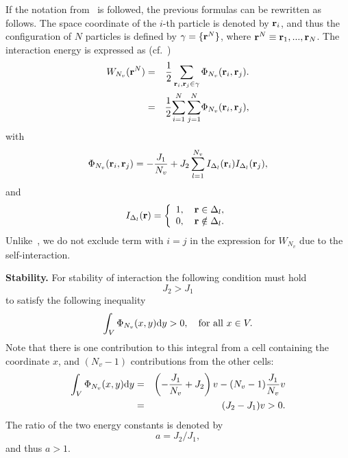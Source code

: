 \documentclass[12pt]{article}
\numberwithin{equation}{section}
\begin{document}
	\begin{mdframed}[linecolor=black,linewidth=1pt,leftline=true]
	If the notation from~\cite{HansenMcDonald13} is followed, the previous formulas can be rewritten as follows. The space coordinate of the $i$-th particle is denoted by $\vb{r}_i$, and thus the configuration of $N$ particles is defined by $\gamma = \{\vb{r}^N\}$, where $\vb{r}^N \equiv \vb{r}_1, ..., \vb{r}_N$. The interaction energy is expressed as (cf.~\cite[eq.~(2.5.16)]{HansenMcDonald13})
	\begin{eqnarray*}
		W_{N_v}(\vb{r}^N) & = & \frac{1}{2} \sum_{\vb{r}_i,\vb{r}_j \in \gamma} \Phi_{N_v} (\vb{r}_i,\vb{r}_j).
		\\
		& = & \frac12 {\sum_{i=1}^N \sum_{j=1}^N} \Phi_{N_v} (\vb{r}_i,\vb{r}_j),
	\end{eqnarray*}
	with
	\begin{equation*}
		\Phi_{N_v}(\vb{r}_i, \vb{r}_j) = -\frac{J_1}{N_v} + J_2\sum_{l=1}^{N_v} I_{\Delta_l}(\vb{r}_i) I_{\Delta_l}(\vb{r}_j),
	\end{equation*}
	and
	\begin{equation*}
		I_{\Delta_l} (\vb{r}) = \left\{
		\begin{array}{ll}
			1, \quad \vb{r} \in \Delta_l,
			\\
			0, \quad \vb{r} \notin \Delta_l.
		\end{array}
		\right.
	\end{equation*}
	Unlike~\cite[eq.~(2.5.16)]{HansenMcDonald13}, we do not exclude term with $i = j$ in the expression for $W_{N_v}$ due to the self-interaction.
	\end{mdframed}
	
	\textbf{Stability.} For stability of interaction the following condition must hold
	\begin{equation*}
		J_2 > J_1
	\end{equation*}
	to satisfy the following inequality~\cite{KKD20,Ruelle70}
	\begin{equation}
		\int_{V} \Phi_{N_v}(x,y) {\rm d}y > 0, \quad \text{for all } x \in V.
	\end{equation}
	Note that there is one contribution to this integral from a cell containing the coordinate $x$, and $(N_v - 1)$ contributions from the other cells:
	\begin{eqnarray*}
		\int_{V} \Phi_{N_v}(x,y) {\rm d}y & = & \left(-\frac{J_1}{N_v} + J_2\right)v - (N_v - 1) \frac{J_1}{N_v}v
		\\
		& = & (J_2 - J_1)v > 0.
	\end{eqnarray*}
	The ratio of the two energy constants is denoted by
	$$a = J_2/J_1,$$
	and thus $a > 1.$
	
\end{document}
